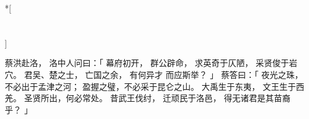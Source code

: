 
\switchcolumn[0]*[\section{}]

蔡洪赴洛，
洛中人问曰：「
    幕府初开，
    群公辟命，
    求英奇于仄陋，
    采贤俊于岩穴。
    君吴、楚之士，
    亡国之余，
    有何异才
    而应斯举？
」
蔡答曰：「
    夜光之珠，不必出于孟津之河；
    盈握之璧，不必采于昆仑之山。
    大禹生于东夷，
    文王生于西羌。
    圣贤所出，何必常处。
    昔武王伐纣，
    迁顽民于洛邑，
    得无诸君是其苗裔乎？
」

\switchcolumn


